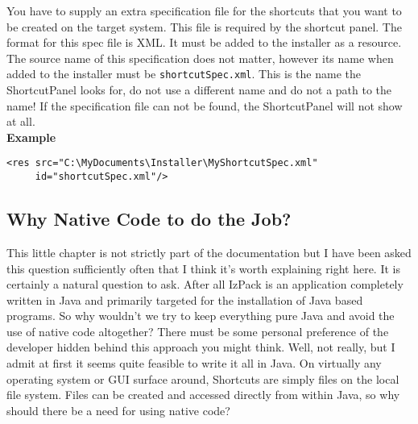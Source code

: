You have to supply an extra specification file for the shortcuts that
you want to be  created on the target system. This file is required by
the shortcut panel. The format for this spec file is XML. It must be
added to the installer as a resource. The source name of this
specification does not matter, however its name when added to the
installer must be \texttt{shortcutSpec.xml}. This is the name the
ShortcutPanel looks for, do not use a different name and do not a path
to the name! If the specification file can not be found, the
ShortcutPanel will not show at all.\\

\textbf{Example}\\

\footnotesize
\begin{verbatim}
<res src="C:\MyDocuments\Installer\MyShortcutSpec.xml" 
     id="shortcutSpec.xml"/>
\end{verbatim}
\normalsize

\subsection{Why Native Code to do the Job?}

This little chapter is not strictly part of the documentation but I have
been asked this question sufficiently often that I think it's worth
explaining right here. It is certainly a natural question to ask. After
all IzPack is an application completely written in Java and primarily
targeted for the installation of Java based programs. So why wouldn't we
try to keep everything pure Java and avoid the use of native code
altogether? There must be some personal preference of the developer
hidden behind this approach you might think. Well, not really, but I
admit at first it seems quite feasible to write it all in Java. On
virtually any operating system or GUI surface around, Shortcuts are
simply files on the local file system. Files can be created and accessed
directly from within Java, so why should there be a need for using
native code?\\

